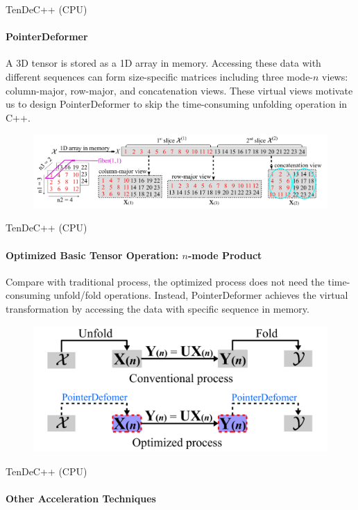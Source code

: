 \documentclass[t, 10pt, handout, aspectratio=169]{beamer}
\begin{document}
\begin{frame}{TenDeC++ (CPU)}
\framesubtitle{PointerDeformer}
A 3D tensor is stored as a 1D array in memory. Accessing these data with different sequences can form size-specific matrices including three mode-$n$ views: column-major, row-major, and concatenation views. These virtual views motivate us to design PointerDeformer to skip the time-consuming unfolding operation in C++.
\begin{figure}
	\centering  
	\includegraphics[width=\linewidth]{figs/pointerdeformer_example.png}
	\label{fig:pointerdeformer_example}
\end{figure}
\end{frame}

\begin{frame}{TenDeC++ (CPU)}
\framesubtitle{Optimized Basic Tensor Operation: $n$-mode Product}
Compare with traditional process, the optimized process does not need the time-consuming unfold/fold operations. Instead, PointerDeformer achieves the virtual transformation by accessing the data with specific sequence in memory.
\begin{figure}
	\centering  
	\includegraphics[width=0.6\linewidth]{figs/tendecpp_optimized.png}
	\label{fig:tendecpp_optimized}
\end{figure}
\end{frame}

\begin{frame}{TenDeC++ (CPU)}
\framesubtitle{Other Acceleration Techniques}
\large
{}
\end{frame}
\end{document}
